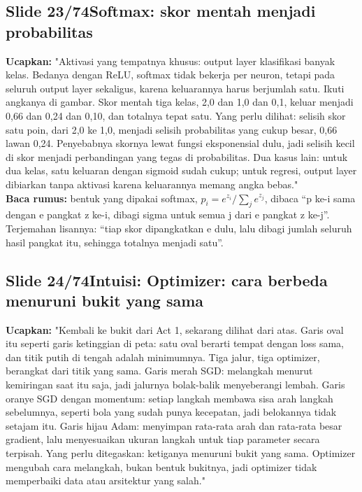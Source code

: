 \documentclass[11pt]{article}
\renewcommand{\framebox}[1]{\colorbox{acc!15}{\textcolor{acc}{\textbf{#1}}}}
\begin{document}
\subsection*{\framebox{Slide 23/74}\quad Softmax: skor mentah menjadi probabilitas}
\textbf{Ucapkan:} "Aktivasi yang tempatnya khusus: output layer klasifikasi banyak kelas. Bedanya dengan ReLU, softmax tidak bekerja per neuron, tetapi pada seluruh output layer sekaligus, karena keluarannya harus berjumlah satu. Ikuti angkanya di gambar. Skor mentah tiga kelas, 2,0 dan 1,0 dan 0,1, keluar menjadi 0,66 dan 0,24 dan 0,10, dan totalnya tepat satu. Yang perlu dilihat: selisih skor satu poin, dari 2,0 ke 1,0, menjadi selisih probabilitas yang cukup besar, 0,66 lawan 0,24. Penyebabnya skornya lewat fungsi eksponensial dulu, jadi selisih kecil di skor menjadi perbandingan yang tegas di probabilitas. Dua kasus lain: untuk dua kelas, satu keluaran dengan sigmoid sudah cukup; untuk regresi, output layer dibiarkan tanpa aktivasi karena keluarannya memang angka bebas."\\[2pt]
\textbf{Baca rumus:} bentuk yang dipakai softmax, $p_i = e^{z_i} / \sum_j e^{z_j}$, dibaca ``p ke-i sama dengan e pangkat z ke-i, dibagi sigma untuk semua j dari e pangkat z ke-j''. Terjemahan lisannya: ``tiap skor dipangkatkan e dulu, lalu dibagi jumlah seluruh hasil pangkat itu, sehingga totalnya menjadi satu''.\\[2pt]

\subsection*{\framebox{Slide 24/74}\quad Intuisi: Optimizer: cara berbeda menuruni bukit yang sama}
\textbf{Ucapkan:} "Kembali ke bukit dari Act 1, sekarang dilihat dari atas. Garis oval itu seperti garis ketinggian di peta: satu oval berarti tempat dengan loss sama, dan titik putih di tengah adalah minimumnya. Tiga jalur, tiga optimizer, berangkat dari titik yang sama. Garis merah SGD: melangkah menurut kemiringan saat itu saja, jadi jalurnya bolak-balik menyeberangi lembah. Garis oranye SGD dengan momentum: setiap langkah membawa sisa arah langkah sebelumnya, seperti bola yang sudah punya kecepatan, jadi belokannya tidak setajam itu. Garis hijau Adam: menyimpan rata-rata arah dan rata-rata besar gradient, lalu menyesuaikan ukuran langkah untuk tiap parameter secara terpisah. Yang perlu ditegaskan: ketiganya menuruni bukit yang sama. Optimizer mengubah cara melangkah, bukan bentuk bukitnya, jadi optimizer tidak memperbaiki data atau arsitektur yang salah."\\[2pt]
\end{document}
